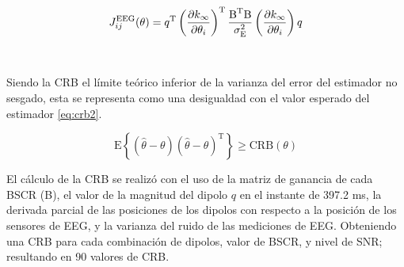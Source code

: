 \begin{equation}
	\label{eq:fisher}
	J_{ij}^{\text{EEG}}(\theta) = q^{\text{T}}\left(\pdv{k_{\infty}}{\theta_{i}}\right)^{\text{T}}\frac{\text{B}^{\text{T}}\text{B}}{\sigma^2_{\text{E}}}\left(\pdv{k_{\infty}}{\theta_{i}}\right)q
\end{equation}

\\

Siendo la CRB el límite teórico inferior de la varianza del error del estimador no sesgado, esta se representa como una desigualdad con el valor esperado del estimador \cref{eq:crb2}.

\begin{equation}
	\label{eq:crb2}
	\text{E}\left\{(\hat{\theta} - \theta)(\hat{\theta} - \theta)^{\text{T}}\right\} \geq \text{CRB}(\theta)
\end{equation}


El cálculo de la CRB se realizó con el uso de la matriz de ganancia de cada BSCR (B), el valor de la magnitud del dipolo $q$ en el instante de 397.2 ms, la derivada parcial de las posiciones de los dipolos con respecto a la posición de los sensores de EEG, y la varianza del ruido de las mediciones de EEG.
Obteniendo una CRB para cada combinación de dipolos, valor de BSCR, y nivel de SNR; resultando en 90 valores de CRB.